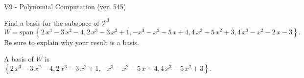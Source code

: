 \begin{exercise}
  \begin{exerciseTitle}V9 - Polynomial Computation (ver. 545)\end{exerciseTitle}
  \begin{exerciseStatement}
    Find a basis for the subspace of \(\mathcal{P}^3\) 
\[W=\mathrm{span}\ \left\{2 \, x^{3} - 3 \, x^{2} - 4 , 2 \, x^{3} - 3 \, x^{2} + 1 , -x^{3} - x^{2} - 5 \, x + 4 , 4 \, x^{3} - 5 \, x^{2} + 3 , 4 \, x^{3} - x^{2} - 2 \, x - 3\right\}.\]
 Be sure to explain why your result is a basis.


  \end{exerciseStatement}
  \begin{exerciseAnswer}
   A basis of \(W\) is  \(\left\{2 \, x^{3} - 3 \, x^{2} - 4 , 2 \, x^{3} - 3 \, x^{2} + 1 , -x^{3} - x^{2} - 5 \, x + 4 , 4 \, x^{3} - 5 \, x^{2} + 3\right\}\).
  


  \end{exerciseAnswer}
\end{exercise}
